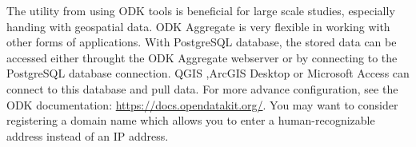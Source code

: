 
The utility from using ODK tools is beneficial for large scale studies, especially handing with geospatial data. ODK Aggregate is very flexible in working with other forms of applications. With PostgreSQL database, the stored data can be accessed either throught the ODK Aggregate webserver or by connecting to the PostgreSQL database connection. QGIS ,ArcGIS Desktop or Microsoft Access can connect to this database and pull data. For more advance configuration, see the ODK documentation: \url{https://docs.opendatakit.org/}. You may want to consider registering a domain name which allows you to enter a human-recognizable address instead of an IP address.
